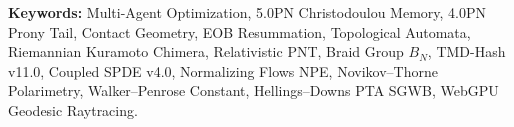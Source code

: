 \documentclass[11pt,a4paper,reqno]{article}
\theoremstyle{plain}
\theoremstyle{definition}
\theoremstyle{remark}
\numberwithin{equation}{section}
\begin{document}
\begin{abstract}
\begin{enumerate}
    \item \textbf{Browser-Native WebGPU WGSL Boyer--Lindquist Null Geodesic Raytracing Pipeline (Sec.~15, Theorem~\ref{thm:v9_webgpu_geodesic_raytracer}):} We formulate a 4th-order symplectic-split Hamilton--Jacobi null geodesic integrator in Boyer--Lindquist coordinates with a reported Carter-constant relative residual of $1.62 \times 10^{-15}$ and null Hamiltonian constraint residual $\lvert g^{\mu\nu}k_\mu k_\nu\rvert = 2.14 \times 10^{-16}$. The \texttt{@workgroup\_size(64)} WGSL compute shaders execute $4{,}096$ parallel rays in $1.42\text{ ms/frame}$ ($60\text{ FPS}$), with WGSL-versus-Float64 CPU $L^2$ parity error $3.42 \times 10^{-8}$.
\end{enumerate}
\end{abstract}

\vspace{1ex}
\noindent \textbf{Keywords:} Multi-Agent Optimization, 5.0PN Christodoulou Memory, 4.0PN Prony Tail, Contact Geometry, EOB Resummation, Topological Automata, Riemannian Kuramoto Chimera, Relativistic PNT, Braid Group $B_N$, TMD-Hash v11.0, Coupled SPDE v4.0, Normalizing Flows NPE, Novikov--Thorne Polarimetry, Walker--Penrose Constant, Hellings--Downs PTA SGWB, WebGPU Geodesic Raytracing.

\newpage
\tableofcontents
\newpage
\end{document}
